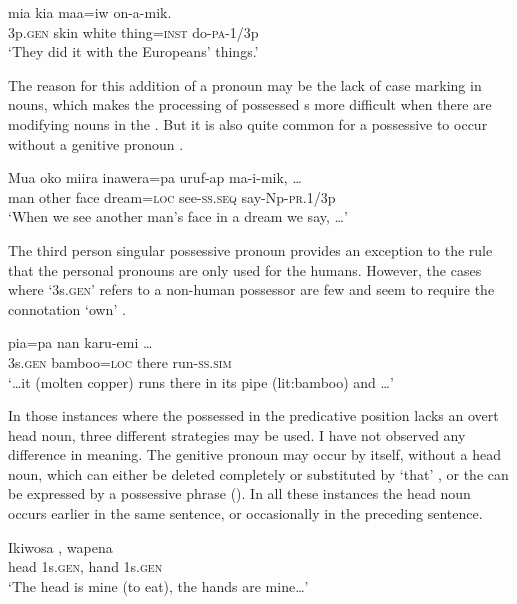 \ea%
\label{ex:3:x574}
\gll {} mia kia maa=iw on-a-mik. \\
3p.\textsc{gen} skin white thing=\textsc{inst} do-\textsc{pa}-1/3p\\
\glt`They did it with the Europeans' things.'
\z

The reason for this addition of a pronoun may be the lack of case marking in nouns, which makes the processing of possessed s more difficult when there are modifying nouns in the . But it is also quite common for a possessive  to occur without a genitive pronoun . 

\ea%
\label{ex:3:x575}
\gll Mua oko miira inawera=pa uruf-ap ma-i-mik, {\dots} \\
man other face dream=\textsc{loc} see-\textsc{ss}.\textsc{seq} say-Np-\textsc{pr}.1/3p\\
\glt`When we see another man's face in a dream we say, {\dots}'
\z

The third person singular possessive pronoun provides an exception to the rule that the personal pronouns are only used for the humans. However, the cases where  `3s.\textsc{gen}' refers to a non-human possessor are few and seem to require the connotation `own' .

\ea%
\label{ex:3:x1808}
\gll {\dots} pia=pa nan karu-emi {\dots} \\
3s.\textsc{gen} bamboo=\textsc{loc} there run-\textsc{ss}.\textsc{sim} \\
\glt`{\dots}it (molten copper) runs there in its pipe (lit:bamboo) and {\dots}'
\z

In those instances where the possessed  in the predicative position lacks an overt head noun, three different strategies may be used. I have not observed any difference in meaning. The genitive pronoun may occur by itself, without a head noun, which can either be deleted completely  or substituted by  `that' , or the  can be expressed by a possessive phrase  (). In all these instances the head noun occurs earlier in the same sentence, or occasionally in the preceding sentence. 

\ea%
\label{ex:3:x576}
\gll Ikiwosa , wapena  \\
head 1s.\textsc{gen}, hand 1s.\textsc{gen}\\
\glt`The head is mine (to eat), the hands are mine{\dots}'
\z

